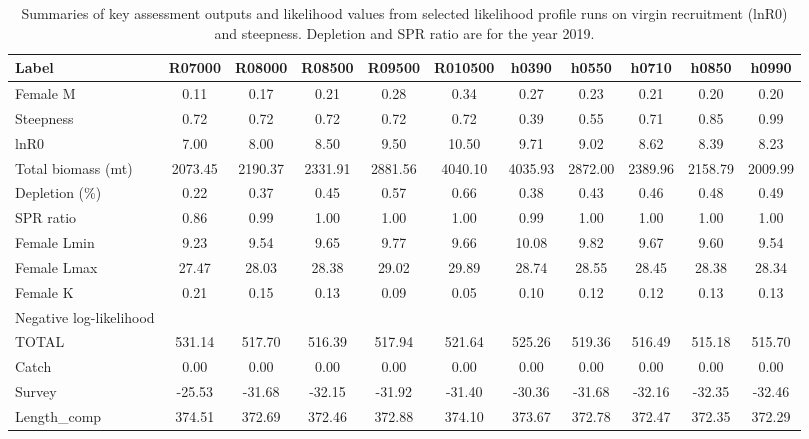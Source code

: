 \documentclass[12pt,]{article}
\begin{document}
\newpage

\begin{landscape}

\begin{table}[ht]
\centering
\caption{Summaries of key assessment outputs 
                                              and likelihood values from selected 
                                              likelihood profile runs on virgin 
                                              recruitment (lnR0) and steepness.  
                                              Depletion and SPR ratio are for the year 2019.} 
\label{tab:like_profiles}
\begin{tabular}{l|ccccc|ccccc}
  \hline
Label & R07000 & R08000 & R08500 & R09500 & R010500 & h0390 & h0550 & h0710 & h0850 & h0990 \\ 
  \hline
Female M & 0.11 & 0.17 & 0.21 & 0.28 & 0.34 & 0.27 & 0.23 & 0.21 & 0.20 & 0.20 \\ 
  Steepness & 0.72 & 0.72 & 0.72 & 0.72 & 0.72 & 0.39 & 0.55 & 0.71 & 0.85 & 0.99 \\ 
  lnR0 & 7.00 & 8.00 & 8.50 & 9.50 & 10.50 & 9.71 & 9.02 & 8.62 & 8.39 & 8.23 \\ 
  Total biomass (mt) & 2073.45 & 2190.37 & 2331.91 & 2881.56 & 4040.10 & 4035.93 & 2872.00 & 2389.96 & 2158.79 & 2009.99 \\ 
  Depletion (\%) & 0.22 & 0.37 & 0.45 & 0.57 & 0.66 & 0.38 & 0.43 & 0.46 & 0.48 & 0.49 \\ 
  SPR ratio & 0.86 & 0.99 & 1.00 & 1.00 & 1.00 & 0.99 & 1.00 & 1.00 & 1.00 & 1.00 \\ 
  Female Lmin & 9.23 & 9.54 & 9.65 & 9.77 & 9.66 & 10.08 & 9.82 & 9.67 & 9.60 & 9.54 \\ 
  Female Lmax & 27.47 & 28.03 & 28.38 & 29.02 & 29.89 & 28.74 & 28.55 & 28.45 & 28.38 & 28.34 \\ 
  Female K & 0.21 & 0.15 & 0.13 & 0.09 & 0.05 & 0.10 & 0.12 & 0.12 & 0.13 & 0.13 \\ 
  Negative log-likelihood &  &  &  &  &  &  &  &  &  &  \\ 
  TOTAL & 531.14 & 517.70 & 516.39 & 517.94 & 521.64 & 525.26 & 519.36 & 516.49 & 515.18 & 515.70 \\ 
  Catch & 0.00 & 0.00 & 0.00 & 0.00 & 0.00 & 0.00 & 0.00 & 0.00 & 0.00 & 0.00 \\ 
  Survey & -25.53 & -31.68 & -32.15 & -31.92 & -31.40 & -30.36 & -31.68 & -32.16 & -32.35 & -32.46 \\ 
  Length\_comp & 374.51 & 372.69 & 372.46 & 372.88 & 374.10 & 373.67 & 372.78 & 372.47 & 372.35 & 372.29 \\ 

\end{tabular}
\end{table}
\end{landscape}
\end{document}
